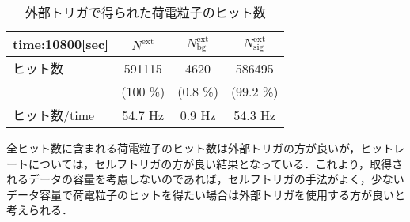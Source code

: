 \begin{table}[h]
  \centering
  \caption{外部トリガで得られた荷電粒子のヒット数}
  \begin{tabular} {l|ccc} \hline
    time:10800[sec]& $N^{\mathrm{ext}}$ & $N_{\mathrm{bg}}^{\mathrm{ext}}$ & $N_{\mathrm{sig}}^{\mathrm{ext}}$ \\ \hline \hline
    ヒット数 & 591115 & 4620 & 586495 \\
    & (100 \%) & (0.8 \%) & (99.2 \%) \\ \hline
    ヒット数/time & 54.7 $\mathrm{Hz}$ & 0.9 $\mathrm{Hz}$ & 54.3 $\mathrm{Hz}$ \\ \hline
  \end{tabular}
  \label{tab:extpcomp}
\end{table}

 
全ヒット数に含まれる荷電粒子のヒット数は外部トリガの方が良いが，ヒットレートについては，セルフトリガの方が良い結果となっている．これより，取得されるデータの容量を考慮しないのであれば，セルフトリガの手法がよく，少ないデータ容量で荷電粒子のヒットを得たい場合は外部トリガを使用する方が良いと考えられる．


